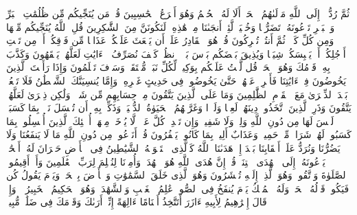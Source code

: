 \startbuffer[\q:6:62]
ثُمَّ رُدُّوۤا۟ إِلَى ٱللَّهِ مَوۡلَىٰهُمُ ٱلۡحَقِّۚ أَلَا لَهُ ٱلۡحُكۡمُ وَهُوَ أَسۡرَعُ ٱلۡحَٰسِبِینَ%
\stopbuffer%
\startbuffer[\q:6:63]
قُلۡ مَن یُنَجِّیكُم مِّن ظُلُمَٰتِ ٱلۡبَرِّ وَٱلۡبَحۡرِ تَدۡعُونَهُۥ تَضَرُّعࣰا وَخُفۡیَةࣰ لَّئِنۡ أَنجَىٰنَا مِنۡ هَٰذِهِۦ لَنَكُونَنَّ مِنَ ٱلشَّٰكِرِینَ%
\stopbuffer%
\startbuffer[\q:6:64]
قُلِ ٱللَّهُ یُنَجِّیكُم مِّنۡهَا وَمِن كُلِّ كَرۡبࣲ ثُمَّ أَنتُمۡ تُشۡرِكُونَ%
\stopbuffer%
\startbuffer[\q:6:65]
قُلۡ هُوَ ٱلۡقَادِرُ عَلَىٰۤ أَن یَبۡعَثَ عَلَیۡكُمۡ عَذَابࣰا مِّن فَوۡقِكُمۡ أَوۡ مِن تَحۡتِ أَرۡجُلِكُمۡ أَوۡ یَلۡبِسَكُمۡ شِیَعࣰا وَیُذِیقَ بَعۡضَكُم بَأۡسَ بَعۡضٍۗ ٱنظُرۡ كَیۡفَ نُصَرِّفُ ٱلۡءَایَٰتِ لَعَلَّهُمۡ یَفۡقَهُونَ%
\stopbuffer%
\startbuffer[\q:6:66]
وَكَذَّبَ بِهِۦ قَوۡمُكَ وَهُوَ ٱلۡحَقُّۚ قُل لَّسۡتُ عَلَیۡكُم بِوَكِیلࣲ%
\stopbuffer%
\startbuffer[\q:6:67]
لِّكُلِّ نَبَإࣲ مُّسۡتَقَرࣱّۚ وَسَوۡفَ تَعۡلَمُونَ%
\stopbuffer%
\startbuffer[\q:6:68]
وَإِذَا رَأَیۡتَ ٱلَّذِینَ یَخُوضُونَ فِیۤ ءَایَٰتِنَا فَأَعۡرِضۡ عَنۡهُمۡ حَتَّىٰ یَخُوضُوا۟ فِی حَدِیثٍ غَیۡرِهِۦۚ وَإِمَّا یُنسِیَنَّكَ ٱلشَّیۡطَٰنُ فَلَا تَقۡعُدۡ بَعۡدَ ٱلذِّكۡرَىٰ مَعَ ٱلۡقَوۡمِ ٱلظَّٰلِمِینَ%
\stopbuffer%
\startbuffer[\q:6:69]
وَمَا عَلَى ٱلَّذِینَ یَتَّقُونَ مِنۡ حِسَابِهِم مِّن شَیۡءࣲ وَلَٰكِن ذِكۡرَىٰ لَعَلَّهُمۡ یَتَّقُونَ%
\stopbuffer%
\startbuffer[\q:6:70]
وَذَرِ ٱلَّذِینَ ٱتَّخَذُوا۟ دِینَهُمۡ لَعِبࣰا وَلَهۡوࣰا وَغَرَّتۡهُمُ ٱلۡحَیَوٰةُ ٱلدُّنۡیَاۚ وَذَكِّرۡ بِهِۦۤ أَن تُبۡسَلَ نَفۡسُۢ بِمَا كَسَبَتۡ لَیۡسَ لَهَا مِن دُونِ ٱللَّهِ وَلِیࣱّ وَلَا شَفِیعࣱ وَإِن تَعۡدِلۡ كُلَّ عَدۡلࣲ لَّا یُؤۡخَذۡ مِنۡهَاۤۗ أُو۟لَٰۤئِكَ ٱلَّذِینَ أُبۡسِلُوا۟ بِمَا كَسَبُوا۟ۖ لَهُمۡ شَرَابࣱ مِّنۡ حَمِیمࣲ وَعَذَابٌ أَلِیمُۢ بِمَا كَانُوا۟ یَكۡفُرُونَ%
\stopbuffer%
\startbuffer[\q:6:71]
قُلۡ أَنَدۡعُوا۟ مِن دُونِ ٱللَّهِ مَا لَا یَنفَعُنَا وَلَا یَضُرُّنَا وَنُرَدُّ عَلَىٰۤ أَعۡقَابِنَا بَعۡدَ إِذۡ هَدَىٰنَا ٱللَّهُ كَٱلَّذِی ٱسۡتَهۡوَتۡهُ ٱلشَّیَٰطِینُ فِی ٱلۡأَرۡضِ حَیۡرَانَ لَهُۥۤ أَصۡحَٰبࣱ یَدۡعُونَهُۥۤ إِلَى ٱلۡهُدَى ٱئۡتِنَاۗ قُلۡ إِنَّ هُدَى ٱللَّهِ هُوَ ٱلۡهُدَىٰۖ وَأُمِرۡنَا لِنُسۡلِمَ لِرَبِّ ٱلۡعَٰلَمِینَ%
\stopbuffer%
\startbuffer[\q:6:72]
وَأَنۡ أَقِیمُوا۟ ٱلصَّلَوٰةَ وَٱتَّقُوهُۚ وَهُوَ ٱلَّذِیۤ إِلَیۡهِ تُحۡشَرُونَ%
\stopbuffer%
\startbuffer[\q:6:73]
وَهُوَ ٱلَّذِی خَلَقَ ٱلسَّمَٰوَٰتِ وَٱلۡأَرۡضَ بِٱلۡحَقِّۖ وَیَوۡمَ یَقُولُ كُن فَیَكُونُۚ قَوۡلُهُ ٱلۡحَقُّۚ وَلَهُ ٱلۡمُلۡكُ یَوۡمَ یُنفَخُ فِی ٱلصُّورِۚ عَٰلِمُ ٱلۡغَیۡبِ وَٱلشَّهَٰدَةِۚ وَهُوَ ٱلۡحَكِیمُ ٱلۡخَبِیرُ%
\stopbuffer%
\startbuffer[\q:6:74]
۞ وَإِذۡ قَالَ إِبۡرَٰهِیمُ لِأَبِیهِ ءَازَرَ أَتَتَّخِذُ أَصۡنَامًا ءَالِهَةً إِنِّیۤ أَرَىٰكَ وَقَوۡمَكَ فِی ضَلَٰلࣲ مُّبِینࣲ%
